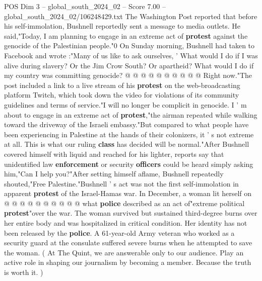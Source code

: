 \begin{textsample}{POS Dim 3 – global\_south\_2024\_02 – Score 7.00 – global\_south\_2024\_02/106248429.txt}
The Washington Post reported that before his self-immolation, Bushnell reportedly sent a message to media outlets.
He said,"Today, I am planning to engage in an extreme act of \textbf{protest} against the genocide of the Palestinian people."0 On Sunday morning, Bushnell had taken to Facebook and wrote :"Many of us like to ask ourselves, ' What would I do if I was alive during slavery?
Or the Jim Crow South?
Or apartheid?
What would I do if my country was committing genocide? @ @ @ @ @ @ @ @ @ @ Right now."The post included a link to a live stream of his \textbf{protest} on the web-broadcasting platform Twitch, which took down the video for violations of its community guidelines and terms of service."I will no longer be complicit in genocide.
I ' m about to engage in an extreme act of \textbf{protest},"the airman repeated while walking toward the driveway of the Israeli embassy."But compared to what people have been experiencing in Palestine at the hands of their colonizers, it ' s not extreme at all.
This is what our ruling \textbf{class} has decided will be normal."After Bushnell covered himself with liquid and reached for his lighter, reports say that unidentified law \textbf{enforcement} or security \textbf{officers} could be heard simply asking him,"Can I help you?"After setting himself aflame, Bushnell repeatedly shouted,"Free Palestine."Bushnell ' s act was not the first self-immolation in apparent \textbf{protest} of the Israel-Hamas war.
In December, a woman lit herself on @ @ @ @ @ @ @ @ @ @ what \textbf{police} described as an act of"extreme political \textbf{protest}"over the war.
The woman survived but sustained third-degree burns over her entire body and was hospitalized in critical condition.
Her identity has not been released by the \textbf{police}.
A 61-year-old Army veteran who worked as a security guard at the consulate suffered severe burns when he attempted to save the woman. ( At The Quint, we are answerable only to our audience.
Play an active role in shaping our journalism by becoming a member.
Because the truth is worth it. )

\end{textsample}
